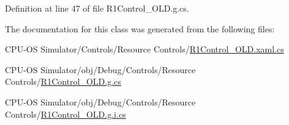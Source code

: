 Definition at line 47 of file R1\+Control\+\_\+\+O\+L\+D.\+g.\+cs.



The documentation for this class was generated from the following files\+:\begin{DoxyCompactItemize}
\item 
C\+P\+U-\/\+O\+S Simulator/\+Controls/\+Resource Controls/\hyperlink{_r1_control___o_l_d_8xaml_8cs}{R1\+Control\+\_\+\+O\+L\+D.\+xaml.\+cs}\item 
C\+P\+U-\/\+O\+S Simulator/obj/\+Debug/\+Controls/\+Resource Controls/\hyperlink{_r1_control___o_l_d_8g_8cs}{R1\+Control\+\_\+\+O\+L\+D.\+g.\+cs}\item 
C\+P\+U-\/\+O\+S Simulator/obj/\+Debug/\+Controls/\+Resource Controls/\hyperlink{_r1_control___o_l_d_8g_8i_8cs}{R1\+Control\+\_\+\+O\+L\+D.\+g.\+i.\+cs}\end{DoxyCompactItemize}
